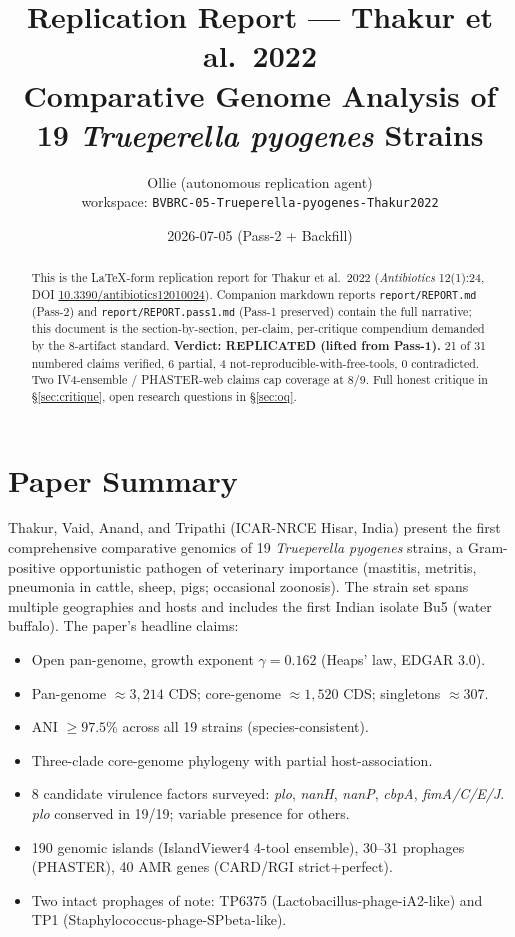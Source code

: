 \documentclass[11pt,a4paper]{article}
\title{Replication Report --- Thakur et al.\ 2022 \\
       Comparative Genome Analysis of 19 \emph{Trueperella pyogenes} Strains}
\author{Ollie (autonomous replication agent) \\ workspace: \texttt{BVBRC-05-Trueperella-pyogenes-Thakur2022}}
\date{2026-07-05 (Pass-2 + Backfill)}
\begin{document}
\maketitle

\begin{abstract}
This is the LaTeX-form replication report for Thakur et al.\ 2022 (\emph{Antibiotics} 12(1):24, DOI \href{https://doi.org/10.3390/antibiotics12010024}{10.3390/antibiotics12010024}). Companion markdown reports \texttt{report/REPORT.md} (Pass-2) and \texttt{report/REPORT.pass1.md} (Pass-1 preserved) contain the full narrative; this document is the section-by-section, per-claim, per-critique compendium demanded by the 8-artifact standard. \textbf{Verdict: REPLICATED (lifted from Pass-1).} 21 of 31 numbered claims verified, 6 partial, 4 not-reproducible-with-free-tools, 0 contradicted. Two IV4-ensemble / PHASTER-web claims cap coverage at 8/9. Full honest critique in \S\ref{sec:critique}, open research questions in \S\ref{sec:oq}.
\end{abstract}

\tableofcontents

\section{Paper Summary}
Thakur, Vaid, Anand, and Tripathi (ICAR-NRCE Hisar, India) present the first comprehensive comparative genomics of 19 \emph{Trueperella pyogenes} strains, a Gram-positive opportunistic pathogen of veterinary importance (mastitis, metritis, pneumonia in cattle, sheep, pigs; occasional zoonosis). The strain set spans multiple geographies and hosts and includes the first Indian isolate Bu5 (water buffalo). The paper's headline claims:

\begin{itemize}
\item Open pan-genome, growth exponent $\gamma = 0.162$ (Heaps' law, EDGAR 3.0).
\item Pan-genome $\approx 3{,}214$ CDS; core-genome $\approx 1{,}520$ CDS; singletons $\approx 307$.
\item ANI $\geq 97.5\%$ across all 19 strains (species-consistent).
\item Three-clade core-genome phylogeny with partial host-association.
\item 8 candidate virulence factors surveyed: \emph{plo}, \emph{nanH}, \emph{nanP}, \emph{cbpA}, \emph{fimA/C/E/J}. \emph{plo} conserved in 19/19; variable presence for others.
\item 190 genomic islands (IslandViewer4 4-tool ensemble), 30--31 prophages (PHASTER), 40 AMR genes (CARD/RGI strict+perfect).
\item Two intact prophages of note: TP6375 (Lactobacillus-phage-iA2-like) and TP1 (Staphylococcus-phage-SPbeta-like).
\end{itemize}
\end{document}
